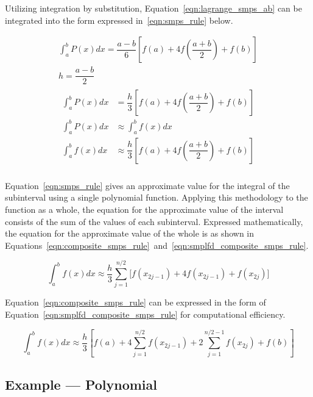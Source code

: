 \documentclass{paper}
\begin{document}
\noindent
Utilizing integration by substitution, Equation~\ref{eqn:lagrange_smps_ab} can be integrated into the form expressed in~\eqref{eqn:smps_rule} below.

\begin{equation}
    \label{eqn:smps_rule}
    \begin{gathered}
    \int_a^b P(x) dx = \dfrac{a - b}{6} \left[f(a) + 4f\left(\dfrac{a + b}{2}\right) + f(b)\right]          \\
    h = \dfrac{a - b}{2}                                                                                    \\
    \begin{aligned}
        \int_a^b P(x) dx &= \dfrac{h}{3} \left[f(a) + 4f\left(\dfrac{a + b}{2}\right) + f(b)\right]         \\
        \int_a^b P(x) dx &\approx \int_a^b f(x) dx                                                          \\
        \int_a^b f(x) dx &\approx \dfrac{h}{3} \left[f(a) + 4f\left(\dfrac{a + b}{2}\right) + f(b)\right]   \\
    \end{aligned}
\end{gathered}
\end{equation}

\noindent
Equation~\ref{eqn:smps_rule} gives an approximate value for the integral of the subinterval using a single polynomial function.
Applying this methodology to the function as a whole, the equation for the approximate value of the interval consists of the sum of the values of each subinterval.
Expressed mathematically, the equation for the approximate value of the whole is as shown in Equations~\ref{eqn:composite_smps_rule}~and~\ref{eqn:smplfd_composite_smps_rule}.

\begin{equation}
    \label{eqn:composite_smps_rule}
    \int_a^b f(x) dx \approx \dfrac{h}{3} \sum_{j=1}^{n / 2} \biggl[f(x_{2j-1}) + 4f(x_{2j-1}) + f(x_{2j})\biggr]
\end{equation}

\noindent
Equation~\ref{eqn:composite_smps_rule} can be expressed in the form of Equation~\ref{eqn:smplfd_composite_smps_rule} for computational efficiency.

\begin{equation}
    \label{eqn:smplfd_composite_smps_rule}
    \int_a^b f(x) dx \approx \dfrac{h}{3} \left[f(a) + 4 \sum_{j=1}^{n / 2} f(x_{2j-1}) + 2  \sum_{j=1}^{n / 2 - 1} f(x_{2j}) + f(b)\right]
\end{equation}

\subsection{Example --- Polynomial}

% 
% 
\end{document}
